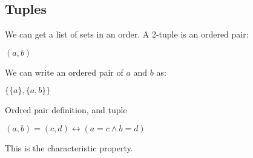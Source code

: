 
\subsection{Tuples}

We can get a list of sets in an order. A 2-tuple is an ordered pair:

\((a, b)\)

We can write an ordered pair of \(a\) and \(b\) as:

$\{\{a\},\{a,b\}\}$

Ordred pair definition, and tuple

\((a,b)=(c,d) \leftrightarrow (a=c\land b=d)\)

This is the characteristic property.

